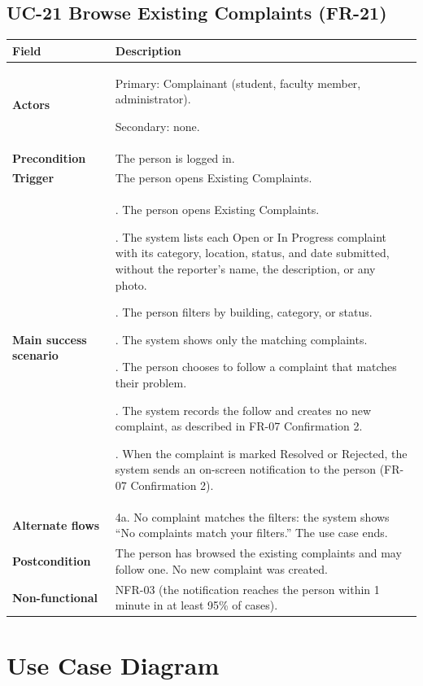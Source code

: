 \documentclass[11pt,a4paper]{report}
\begin{document}
\section{UC-21 Browse Existing Complaints (FR-21)}
\begin{longtable}{|>{\raggedright\arraybackslash}p{3.0cm}|>{\raggedright\arraybackslash}p{12.4cm}|}
\hline \textbf{Field} & \textbf{Description} \\ \hline \endhead
\textbf{Actors} & Primary: Complainant (student, faculty member, administrator).\par\smallskip Secondary: none. \\ \hline
\textbf{Precondition} & The person is logged in. \\ \hline
\textbf{Trigger} & The person opens Existing Complaints. \\ \hline
\textbf{Main success scenario} & 1. The person opens Existing Complaints.\par\smallskip 2. The system lists each Open or In Progress complaint with its category, location, status, and date submitted, without the reporter's name, the description, or any photo.\par\smallskip 3. The person filters by building, category, or status.\par\smallskip 4. The system shows only the matching complaints.\par\smallskip 5. The person chooses to follow a complaint that matches their problem.\par\smallskip 6. The system records the follow and creates no new complaint, as described in FR-07 Confirmation 2.\par\smallskip 7. When the complaint is marked Resolved or Rejected, the system sends an on-screen notification to the person (FR-07 Confirmation 2). \\ \hline
\textbf{Alternate flows} & 4a. No complaint matches the filters: the system shows ``No complaints match your filters.'' The use case ends. \\ \hline
\textbf{Postcondition} & The person has browsed the existing complaints and may follow one. No new complaint was created. \\ \hline
\textbf{Non-functional} & NFR-03 (the notification reaches the person within 1 minute in at least 95\% of cases). \\ \hline
\end{longtable}

\chapter{Use Case Diagram}
\end{document}

